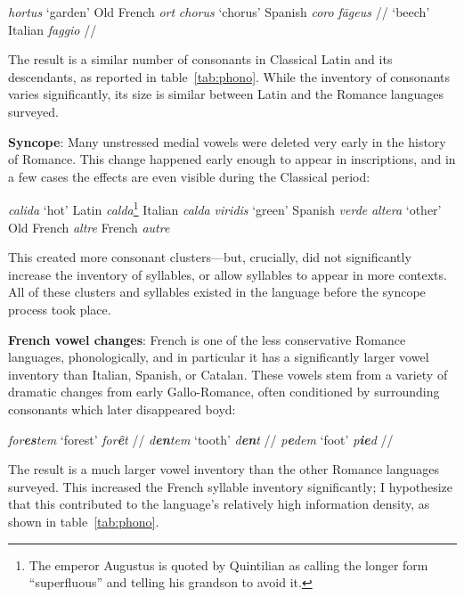 \documentclass[12pt,twoside,leqno]{article} %
\newcommand{\ipa}[1]{/\textipa{#1}/}
\newcommand{\yields}{\textrightarrow}
\begin{document}
\begin{exe}
\ex \emph{hortus} `garden' \yields{} Old French \emph{ort}
\ex \emph{chorus} `chorus' \yields{} Spanish \emph{coro}
\ex \emph{f\=ageus} \ipa{fa:geus} `beech' \yields{} Italian \emph{faggio} \ipa{faddZo}
\end{exe}

The result is a similar number of consonants in Classical Latin and its descendants, as reported in table~\ref{tab:phono}. While the inventory of consonants varies significantly, its size is similar between Latin and the Romance languages surveyed.

\textbf{Syncope}: Many unstressed medial vowels were deleted very early in the history of Romance. This change happened early enough to appear in inscriptions, and in a few cases the effects are even visible during the Classical period:

\begin{exe}
\ex \emph{calida} `hot' \yields{} Latin \emph{calda}\footnote{The emperor Augustus is quoted by Quintilian \citep[I.6.19]{quintilian} as calling the longer form ``superfluous'' and telling his grandson to avoid it.} \yields{} Italian \emph{calda}
\ex \emph{viridis} `green' \yields{} Spanish \emph{verde}
\ex \emph{altera} `other' \yields{} Old French \emph{altre} \yields{} French \emph{autre}
\end{exe}

This created more consonant clusters---but, crucially, did not significantly increase the inventory of syllables, or allow syllables to appear in more contexts. All of these clusters and syllables existed in the language before the syncope process took place.

\textbf{French vowel changes}: French is one of the less conservative Romance languages, phonologically, and in particular it has a significantly larger vowel inventory than Italian, Spanish, or Catalan. These vowels stem from a variety of dramatic changes from early Gallo-Romance, often conditioned by surrounding consonants which later disappeared \parencite{pope}{boyd}:

\begin{exe}
\ex \emph{for\textbf{es}tem} `forest' \yields{} \emph{for\textbf{\^e}t} \ipa{fOKE}
\ex \emph{d\textbf{en}tem} `tooth' \yields{} \emph{d\textbf{en}t} \ipa{d\~A}
\ex \emph{p\textbf{e}dem} `foot' \yields{} \emph{p\textbf{ie}d} \ipa{pje}
\end{exe}

The result is a much larger vowel inventory than the other Romance languages surveyed. This increased the French syllable inventory significantly; I hypothesize that this contributed to the language's relatively high information density, as shown in table~\ref{tab:phono}.
\end{document}
